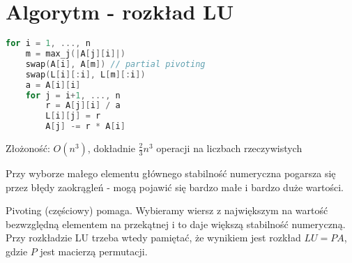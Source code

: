 \section{Algorytm - rozkład LU}
\begin{lstlisting}[language=Cpp]
for i = 1, ..., n
    m = max_j(|A[j][i]|)
    swap(A[i], A[m]) // partial pivoting
    swap(L[i][:i], L[m][:i])
    a = A[i][i]
    for j = i+1, ..., n
        r = A[j][i] / a
        L[i][j] = r
        A[j] -= r * A[i]
\end{lstlisting}
\noindent
Złożoność: \( O(n^3) \), dokładnie \( \frac{2}{3}n^3 \) operacji na liczbach rzeczywistych

\begin{warning}
Przy wyborze małego elementu głównego stabilność numeryczna pogarsza się przez błędy zaokrągleń - mogą pojawić się bardzo małe i bardzo duże wartości.
\end{warning}

Pivoting (częściowy) pomaga. Wybieramy wiersz z największym na wartość bezwzględną elementem na przekątnej i to daje większą stabilność numeryczną. Przy rozkładzie LU trzeba wtedy pamiętać, że wynikiem jest rozkład \( LU = PA \), gdzie \( P \) jest macierzą permutacji.
